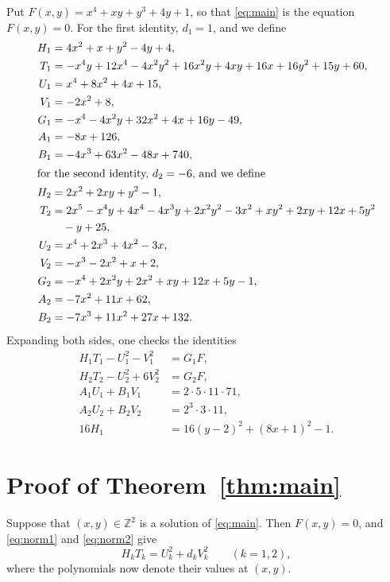 \documentclass[11pt]{article}
\newcommand{\Z}{\mathbb{Z}}
\begin{document}
Put $F(x,y)=x^{4}+xy+y^{3}+4y+1$, so that \eqref{eq:main} is the equation $F(x,y)=0$.
For the first identity, $d_{1}=1$, and we define
\begin{align*}
H_{1}&=4x^{2}+x+y^{2}-4y+4,\\
T_{1}&=-x^{4}y+12x^{4}-4x^{2}y^{2}+16x^{2}y+4xy+16x+16y^{2}+15y+60,\\
U_{1}&=x^{4}+8x^{2}+4x+15,\\
V_{1}&=-2x^{2}+8,\\
G_{1}&=-x^{4}-4x^{2}y+32x^{2}+4x+16y-49,\\
A_{1}&=-8x+126,\\
B_{1}&=-4x^{3}+63x^{2}-48x+740,\\
\intertext{for the second identity, $d_{2}=-6$, and we define}
H_{2}&=2x^{2}+2xy+y^{2}-1,\\
T_{2}&=2x^{5}-x^{4}y+4x^{4}-4x^{3}y+2x^{2}y^{2}-3x^{2}+xy^{2}+2xy+12x+5y^{2}\\
&\quad-y+25,\\
U_{2}&=x^{4}+2x^{3}+4x^{2}-3x,\\
V_{2}&=-x^{3}-2x^{2}+x+2,\\
G_{2}&=-x^{4}+2x^{2}y+2x^{2}+xy+12x+5y-1,\\
A_{2}&=-7x^{2}+11x+62,\\
B_{2}&=-7x^{3}+11x^{2}+27x+132.
\end{align*}
Expanding both sides, one checks the identities
\begin{align}
H_{1}T_{1}-U_{1}^2-V_{1}^2&=G_{1}F,\label{eq:norm1}\\
H_{2}T_{2}-U_{2}^2+6V_{2}^2&=G_{2}F,\label{eq:norm2}\\
A_{1}U_{1}+B_{1}V_{1}&=2\cdot 5\cdot 11\cdot 71,\label{eq:bez1}\\
A_{2}U_{2}+B_{2}V_{2}&=2^{3}\cdot 3\cdot 11,\label{eq:bez2}\\
16H_{1}&=16(y-2)^2+(8x+1)^2-1.\label{eq:sign1}
\end{align}

\section{Proof of Theorem~\ref{thm:main}}

Suppose that $(x,y)\in\Z^2$ is a solution of \eqref{eq:main}. Then $F(x,y)=0$, and \eqref{eq:norm1} and \eqref{eq:norm2} give
\begin{equation}\label{eq:HT}
H_kT_k=U_k^2+d_kV_k^2\qquad(k=1,2),
\end{equation}
where the polynomials now denote their values at $(x,y)$.
\end{document}
